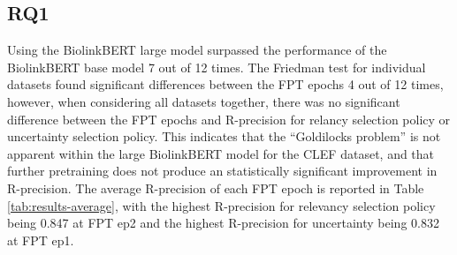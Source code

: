 \documentclass{article}
\begin{document}
\subsection{RQ1}

Using the BiolinkBERT large model surpassed the performance of the BiolinkBERT base model 7 out of 12 times. The Friedman test for individual datasets found significant differences between the FPT epochs 4 out of 12 times, however, when considering all datasets together, there was no significant difference between the FPT epochs and R-precision for relancy selection policy or uncertainty selection policy. This indicates that the ``Goldilocks problem'' is not apparent within the large BiolinkBERT model for the CLEF dataset, and that further pretraining does not produce an statistically significant improvement in R-precision. The average R-precision of each FPT epoch is reported in Table \ref{tab:results-average}, with the highest R-precision for relevancy selection policy being 0.847 at FPT ep2 and the highest R-precision for uncertainty being  0.832 at FPT ep1. 
\end{document}
